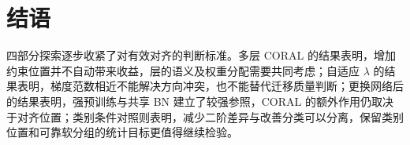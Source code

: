 \section*{结语}

四部分探索逐步收紧了对有效对齐的判断标准。多层 CORAL 的结果表明，增加约束位置并不自动带来收益，层的语义及权重分配需要共同考虑；自适应 $\lambda$ 的结果表明，梯度范数相近不能解决方向冲突，也不能替代迁移质量判断；更换网络后的结果表明，强预训练与共享 BN 建立了较强参照，CORAL 的额外作用仍取决于对齐位置；类别条件对照则表明，减少二阶差异与改善分类可以分离，保留类别位置和可靠软分组的统计目标更值得继续检验。
